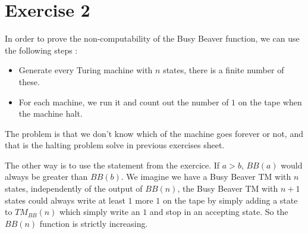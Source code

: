 \documentclass[a4paper,11pt]{report}
\begin{document}
\begin{center}
\end{center}

\section*{Exercise 2}

In order to prove the non-computability of the Busy Beaver function, we can use
the following steps :

\begin{itemize}
\item Generate every Turing machine with $n$ states, there is a finite number of
  these.
\item For each machine, we run it and count out the number of $1$ on the tape
  when the machine halt.
\end{itemize}

The problem is that we don't know which of the machine goes forever or not, and
that is the halting problem solve in previous exercises sheet.

The other way is to use the statement from the exercice. If $a > b$, $BB(a)$
would always be greater than $BB(b)$. We imagine we have a Busy Beaver TM with
$n$ states, independently of the output of $BB(n)$, the Busy Beaver TM with
$n+1$ states could always write at least $1$ more $1$ on the tape by simply
adding a state to $TM_{BB}(n)$ which simply write an $1$ and stop in an
accepting state. So the $BB(n)$ function is strictly increasing.
\end{document}
